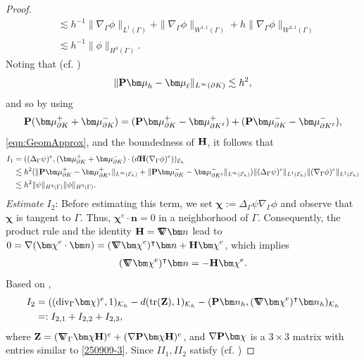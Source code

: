 \documentclass[10pt, a4paper]{amsart}
\newcommand{\bn}{{\bm n}}
\newcommand{\p}{\partial}
\newcommand{\nab}{\nabla}
\newcommand{\bmu}{{\bm \mu}}
\newcommand{\calE}{\mathcal{E}}
\newcommand{\calK}{\mathcal{K}}
\newcommand{\Grad}{\nabla\!\!\!\!\nabla}
\newcommand{\bchi}{{\bm \chi}}
\theoremstyle{definition}
\theoremstyle{remark}
\theoremstyle{example}
\numberwithin{equation}{section}
\begin{document}
\begin{proof}
\begin{align*}
& \lesssim h^{-1}\|\nab_\Gamma\phi\|_{L^1(\Gamma)} + \|\nab_\Gamma\phi\|_{W^{1, 1}(\Gamma)} + h\|\nab_\Gamma\phi\|_{W^{2, 1}(\Gamma)} \\
& \lesssim h^{-1}\|\phi\|_{H^3(\Gamma)}.
\end{align*}
Noting that (cf. \cite[(3.9)]{neilan2025c0})
\[
\|{\bf P}\bmu_h - \bmu_\ell\|_{L^\infty(\p K)} \lesssim h^2,
\]
and so by using
\[
{\bf P}(\bmu_{\p K}^+ + \bmu_{\p K}^-)
= ({\bf P}\bmu_{\p K}^+ - \bmu_{\p K^\ell}^+) + ({\bf P}\bmu_{\p K}^- - \bmu_{\p K^\ell}^-),
\]
\eqref{eqn:GeomApprox}, and the boundedness of ${\bf H}$, it follows that
\begin{align}
\begin{split} \label{250830-2}
I_1
& = ((\Delta_\Gamma\psi)^e, (\bmu_{\p K}^+ + \bmu_{\p K}^-) \cdot (d{\bf H}(\nab_\Gamma\phi)^e))_{\calE_h} \\
& \lesssim h^2(\|{\bf P}\bmu_{\p K}^+ - \bmu_{\p K^\ell}^+\|_{L^\infty(\calE_h)} + \|{\bf P}\bmu_{\p K}^- - \bmu_{\p K^\ell}^-\|_{L^\infty(\calE_h)})\|(\Delta_\Gamma\psi)^e\|_{L^1(\calE_h)}\|(\nab_\Gamma\phi)^e\|_{L^1(\calE_h)} \\
& \lesssim h^2\|\psi\|_{H^4(\Gamma)}\|\phi\|_{H^3(\Gamma)}.
\end{split}
\end{align}
\textit{Estimate} $I_2$: Before estimating this term, we set $\bchi := \Delta_\Gamma \psi \nab_\Gamma \phi$ and observe that $\bchi$ is tangent to $\Gamma$. Thus, $\bchi^e \cdot \bn = 0$ in a neighborhood of $\Gamma$. Consequently, the product rule and the identity ${\bf H} = \Grad\bn$ lead to $0 = \nab(\bchi^e \cdot \bn) = (\Grad\bchi^e)^\intercal\bn + {\bf H}\bchi^e$, which implies
\begin{align}
(\Grad \bchi^e)^\intercal\bn = -{\bf H}\bchi^e. \label{250909-1}
\end{align}
Based on \cite[(C.33)--(C.42)]{LarssonLarson17},
\begin{align}
\begin{split} \label{250830-3}
I_2
& = (({\rm div}_\Gamma\bchi)^e, 1)_{\calK_h} - d({\rm tr}({\bf Z}), 1)_{\calK_h} - ({\bf P}\bn_h, (\Grad\bchi^e)^\intercal\bn_h)_{\calK_h} \\
& =: I_{2,1} + I_{2,2} + I_{2,3},
\end{split}
\end{align}
where ${\bf Z}
= (\Grad_\Gamma\bchi{\bf H})^e + (\nab{\bf P}\bchi{\bf H})^e$, and $\nab{\bf P}\bchi$ is a $3 \times 3$ matrix with entries similar to \eqref{250909-3}. Since $II_1, II_2$ satisfy (cf. \cite[(C.43)--(C.46)]{LarssonLarson17})

\end{proof}
\end{document}
